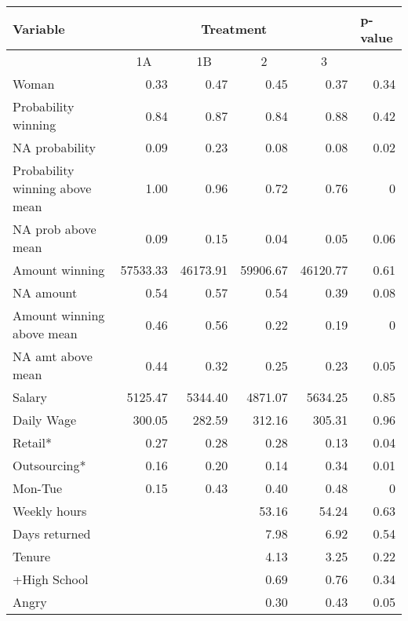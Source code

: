 \begin{tabular}{lrrrrc}
\toprule
Variable & \multicolumn{4}{c}{Treatment} & \multicolumn{1}{l}{p-value} \\
\midrule
\midrule
      & \multicolumn{1}{c}{1A} & \multicolumn{1}{c}{1B} & \multicolumn{1}{c}{2} & \multicolumn{1}{c}{3} &  \\
\midrule
Woman & 0.33  & 0.47  & 0.45  & 0.37  & \multicolumn{1}{r}{0.34} \\
Probability winning & 0.84  & 0.87  & 0.84  & 0.88  & \multicolumn{1}{r}{0.42} \\
NA probability & 0.09  & 0.23  & 0.08  & 0.08  & \multicolumn{1}{r}{0.02} \\
Probability winning above mean & 1.00  & 0.96  & 0.72  & 0.76  & \multicolumn{1}{r}{0} \\
NA prob above mean & 0.09  & 0.15  & 0.04  & 0.05  & \multicolumn{1}{r}{0.06} \\
Amount winning & 57533.33 & 46173.91 & 59906.67 & 46120.77 & \multicolumn{1}{r}{0.61} \\
NA amount & 0.54  & 0.57  & 0.54  & 0.39  & \multicolumn{1}{r}{0.08} \\
Amount winning above mean & 0.46  & 0.56  & 0.22  & 0.19  & \multicolumn{1}{r}{0} \\
NA amt above mean & 0.44  & 0.32  & 0.25  & 0.23  & \multicolumn{1}{r}{0.05} \\
Salary & 5125.47 & 5344.40 & 4871.07 & 5634.25 & \multicolumn{1}{r}{0.85} \\
Daily Wage & 300.05 & 282.59 & 312.16 & 305.31 & \multicolumn{1}{r}{0.96} \\
Retail* & 0.27  & 0.28  & 0.28  & 0.13  & \multicolumn{1}{r}{0.04} \\
Outsourcing* & 0.16  & 0.20  & 0.14  & 0.34  & \multicolumn{1}{r}{0.01} \\
Mon-Tue & 0.15  & 0.43  & 0.40  & 0.48  & \multicolumn{1}{r}{0} \\
Weekly hours &       &       & 53.16 & 54.24 & \multicolumn{1}{r}{0.63} \\
Days returned &       &       & 7.98  & 6.92  & \multicolumn{1}{r}{0.54} \\
Tenure &       &       & 4.13  & 3.25  & \multicolumn{1}{r}{0.22} \\
+High School &       &       & 0.69  & 0.76  & \multicolumn{1}{r}{0.34} \\
Angry &       &       & 0.30  & 0.43  & \multicolumn{1}{r}{0.05} \\

\end{tabular}
